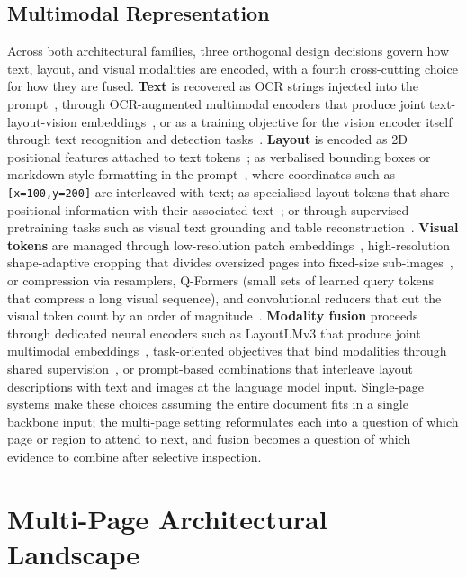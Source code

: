 \documentclass[11pt]{article}
\begin{document}
\subsection{Multimodal Representation}
\label{sec:bg-modality}

Across both architectural families, three orthogonal design decisions govern how text, layout, and visual modalities are encoded, with a fourth cross-cutting choice for how they are fused. \textbf{Text} is recovered as OCR strings injected into the prompt~\cite{wang2024docllm}, through OCR-augmented multimodal encoders that produce joint text-layout-vision embeddings~\cite{luo2024layoutllm,zhu2025enhancing}, or as a training objective for the vision encoder itself through text recognition and detection tasks~\cite{wang2025marten}. \textbf{Layout} is encoded as 2D positional features attached to text tokens~\cite{xu2020layoutlm,zhu2025enhancing}; as verbalised bounding boxes or markdown-style formatting in the prompt~\cite{perot2024lmdx}, where coordinates such as \texttt{[x=100,y=200]} are interleaved with text; as specialised layout tokens that share positional information with their associated text~\cite{zhu2025laytokenllm}; or through supervised pretraining tasks such as visual text grounding and table reconstruction~\cite{liu2024textmonkey}. \textbf{Visual tokens} are managed through low-resolution patch embeddings~\cite{tanaka2024instructdoc}, high-resolution shape-adaptive cropping that divides oversized pages into fixed-size sub-images~\cite{ye2023ureader,hu2024mplugdocowl}, or compression via resamplers, Q-Formers (small sets of learned query tokens that compress a long visual sequence), and convolutional reducers that cut the visual token count by an order of magnitude~\cite{hu2025mplugdocowl2,yu2024texthawk2,liu2024textmonkey}. \textbf{Modality fusion} proceeds through dedicated neural encoders such as LayoutLMv3 that produce joint multimodal embeddings~\cite{huang2022layoutlmv3,luo2024layoutllm}, task-oriented objectives that bind modalities through shared supervision~\cite{hu2024mplugdocowl,wang2025marten}, or prompt-based combinations that interleave layout descriptions with text and images at the language model input. Single-page systems make these choices assuming the entire document fits in a single backbone input; the multi-page setting reformulates each into a question of which page or region to attend to next, and fusion becomes a question of which evidence to combine after selective inspection.

\section{Multi-Page Architectural Landscape}
\label{sec:architecture}
\end{document}
